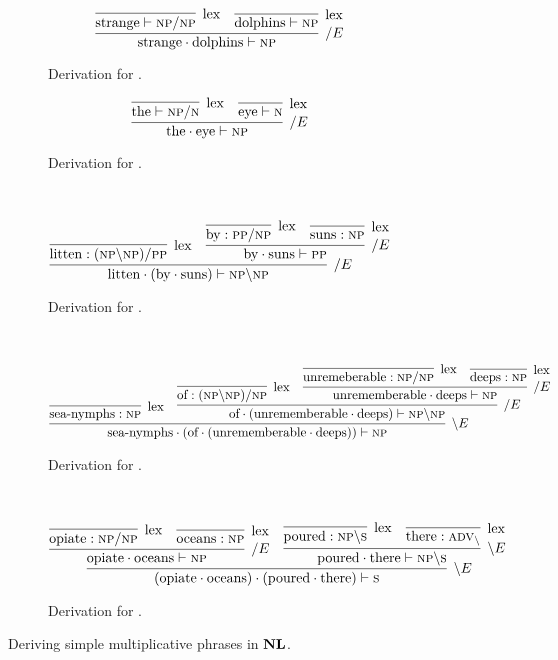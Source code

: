\begin{figure}
		\begin{subfigure}{0.5\textwidth}
		\smaller
			\[
				\infer[\divright E]{\w{strange}\sbind\w{dolphins} \vdash \np}{
					\infer[\Lex]{\w{strange}\vdash \np\divright\np}{}
					&
					\infer[\Lex]{\w{dolphins}\vdash \np}{}
				}
			\]
			\caption{Derivation for .}
			\label{subfigure:strange_dolphins}
		\end{subfigure}%
		\begin{subfigure}{0.5\textwidth}
		\smaller
			\[
				\infer[\divright E]{\w{the}\sbind\w{eye} \vdash \np}{
					\infer[\Lex]{\w{the}\vdash \np\divright\n}{}
					&
					\infer[\Lex]{\w{eye}\vdash \n}{}
				}
			\]
			\caption{Derivation for .}
			\label{subfigure:the_eye}
		\end{subfigure}\\[\midsep]
		\begin{subfigure}{1\textwidth}
			\smaller
			\[
				\infer[\divright E]{\w{litten}\sbind(\w{by}\sbind\w{suns}) \vdash \np\divleft\np}{
					\infer[\Lex]{\w{litten} : (\np\divleft\np)\divright\pp }{}
					&
					\infer[\divright E]{\w{by}\sbind\w{suns} \vdash \pp}{
						\infer[\Lex]{\w{by}: \pp\divright\np}{}
						&
						\infer[\Lex]{\w{suns}: \np}{}
					}
				}
			\]
			\caption{Derivation for .}
			\label{subfigure:litten_by_suns}
		\end{subfigure}\\[\midsep]
		\begin{subfigure}{1\textwidth}
			\smaller
			\[
				\infer[\divleft E]{\w{sea-nymphs}\sbind(\w{of}\sbind(\w{unrememberable}\sbind\w{deeps}))\vdash \np}{
					\infer[\Lex]{\w{sea-nymphs}: \np}{}
					&
					\infer[\divright E]{\w{of}\sbind(\w{unrememberable}\sbind\w{deeps}) \vdash \np\divleft\np}{
						\infer[\Lex]{\w{of}: (\np\divleft\np)\divright\np}{}
						&
						\infer[\divright E]{\w{unrememberable}\sbind\w{deeps} \vdash \np}{
							\infer[\Lex]{\w{unremeberable}: \np\divright\np}{}
							&
							\infer[\Lex]{\w{deeps}: \np}{}
						}
					}
				}
			\]
			\caption{Derivation for .}
			\label{subfigure:sea-nymphs of unrememberable deeps}
	\end{subfigure}\\[\midsep]
	\begin{subfigure}{1\textwidth}
		\smaller
		\[
			\infer[\divleft E]{(\w{opiate}\sbind\w{oceans})\sbind(\w{poured}\sbind\w{there}) \vdash \s}{
				\infer[\divright E]{\w{opiate}\sbind\w{oceans} \vdash \np}{
					\infer[\Lex]{\w{opiate} : \np\divright\np}{}
					&
					\infer[\Lex]{\w{oceans}: \np}{}
				}
				&
				\infer[\divleft E]{\w{poured}\sbind\w{there} \vdash \np\divleft\s}{
					\infer[\Lex]{\w{poured}: \np\divleft\s}{}
					&
					\infer[\Lex]{\w{there}: \gtype{adv}_{\divleft}}{}
				}
			}
		\]
		\caption{Derivation for .}
		\label{subfigure:opiate_oceans_poured_there}
	\end{subfigure}
	\caption{Deriving simple multiplicative phrases in $\textbf{NL}$.}
	\label{figure:nl_applicative_examples}
\end{figure}

